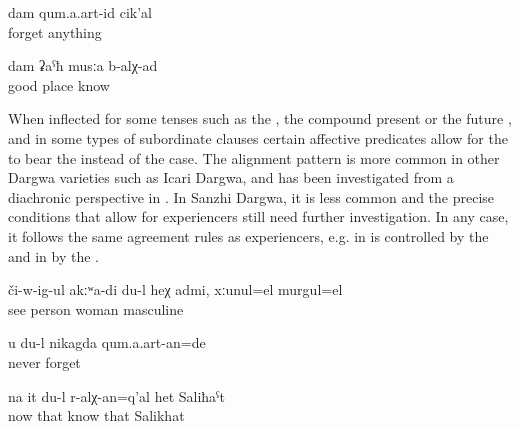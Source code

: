 \begin{exe}
	\ex	\label{ex:I did not forget anythingA}
	\gll	dam	qum.a.art-id	cik'al\\
			forget	anything\\
	\glt	{}

	\ex	\label{ex:I know a good place}
	\gll	dam	ʡaˁħ	musːa	b-alχ-ad\\
			good	place	know\\
	\glt	{}
	
\end{exe}


When inflected for some tenses such as the , the compound present  or the future ,  and in some types of subordinate clauses certain affective predicates allow for the  to bear the  instead of the  case. The  alignment pattern is more common in other Dargwa varieties such as Icari Dargwa, and has been investigated from a diachronic perspective in \citet{Ganenkov2013}. In Sanzhi Dargwa, it is less common and the precise conditions that allow for  experiencers still need further investigation. In any case, it follows the same agreement rules as  experiencers, e.g. in   is controlled by the   and in  by the  . 

\begin{exe}
	\ex	\label{ex:I do not see this person, whether it is female or male}
	\gll	či-w-ig-ul	akːʷa-di	du-l	heχ	admi,	xːunul=el	murgul=el\\
		see				person		woman\tsc{=indq}		masculine\\
	\glt	{}
	
			\ex	\label{ex:‎‎I will never forget you}
	\gll	u	du-l	nikagda	qum.a.art-an=de\\
				never	forget\\
	\glt	{}
	
	\ex	\label{ex:I know her, this Salihat}
	\gll	na	it	du-l	r-alχ-an=q'al	het	Saliħaˁt\\
		now	that		know	that	Salikhat\\
	\glt	{}

\end{exe}



